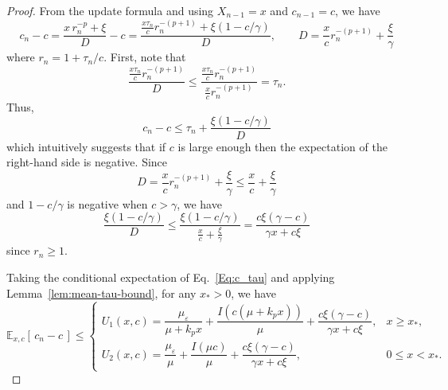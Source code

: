 \documentclass[11pt]{article}
\theoremstyle{definition}
\begin{document}
\begin{proof}
	From the update formula and using $X_{n-1} = x$ and $c_{n-1} = c$, we have
	\[
	c_n - c
	= \frac{x\,r_n^{-p} + \xi}
	{D} - c = 
	\frac{\frac{x \tau_n}{c} r_n^{-(p+1)} + \xi\left(1-c/\gamma\right)}{D}, \quad\quad D=\frac{x}{c} r_n^{-(p+1)}+\frac{\xi}{\gamma}
	\]
	where $r_n = 1 + \tau_n/c$.
	First, note that 
	\[
	\frac{\frac{x\tau_n}{c} r_n^{-(p+1)}}{D}
	\le
	\frac{\frac{x\tau_n}{c} r_n^{-(p+1)}} {\frac{x}{c} r_n^{-(p+1)}}
	= \tau_n.
	\]	
	Thus,
	\begin{equation}
		c_n - c \leq \tau_n + \frac{ \xi(1-c/\gamma)}{D} \label{Eq:c_tau}
	\end{equation}
	which intuitively suggests that if $c$ is large enough then the expectation of the right-hand side is negative.
	Since 
	$$ D=\frac{x}{c} r_n^{-(p+1)}+\frac{\xi}{\gamma} \leq \frac{x}{c} +\frac{\xi}{\gamma}$$
	and $1  - c/\gamma$ is negative when $c > \gamma$, 
	we have
	$$\frac{\xi(1 - c/\gamma)}{D} \le \frac{\xi(1 - c/\gamma)}{\frac{x}{c} + \frac{\xi}{\gamma}} =  \frac{c\xi(\gamma - c)}{\gamma x + c \xi}$$
	since $r_n \ge 1$.
	
	Taking the conditional expectation of Eq.~\eqref{Eq:c_tau} and applying Lemma~\ref{lem:mean-tau-bound}, for any $x_*>0$, we have
	\begin{equation}\label{Eq:U_bound}
		\mathbb{E}_{x,c}[\,c_n - c\,] \leq  
		\begin{cases}
			U_1(x,c)
			= \dfrac{\mu_{\varepsilon}}{\mu + k_p x}
			+ \dfrac{I(c(\mu + k_p x))}{\mu}
			+ \dfrac{c\xi(\gamma - c)}{\gamma x + c \xi},
			& x \ge x_*, \\[2ex]
			U_2(x,c)
			= \dfrac{\mu_{\varepsilon}}{\mu}
			+ \dfrac{I(\mu c)}{\mu}
			+ \dfrac{c\xi(\gamma - c)}{\gamma x + c \xi},
			& 0 \le x < x_* .
		\end{cases} 
	\end{equation}
	

\end{proof}
\end{document}
